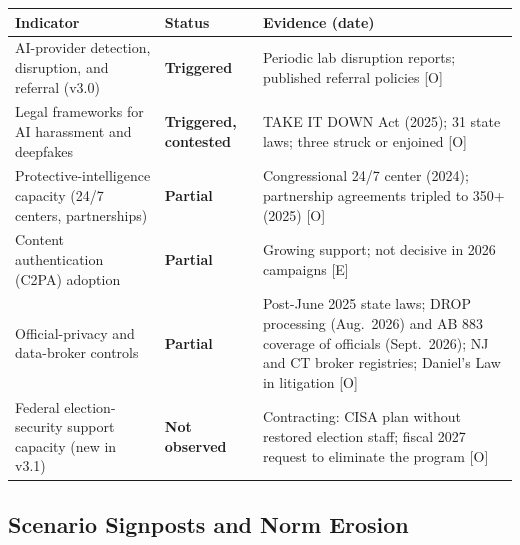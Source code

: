 \documentclass[11pt,letterpaper]{article}
\begin{document}
\begin{center}
\footnotesize
\begin{tabular}{L{4.6cm}L{1.9cm}L{7.6cm}}
\toprule
\textbf{Indicator} & \textbf{Status} & \textbf{Evidence (date)} \\
\midrule
AI-provider detection, disruption, and referral (v3.0) & \textcolor{alertcoral}{\textbf{Triggered}} & Periodic lab disruption reports; published referral policies [O] \\
Legal frameworks for AI harassment and deepfakes & \textcolor{alertcoral}{\textbf{Triggered, contested}} & TAKE IT DOWN Act (2025); 31 state laws; three struck or enjoined [O] \\
Protective-intelligence capacity (24/7 centers, partnerships) & \textcolor{warningamber}{\textbf{Partial}} & Congressional 24/7 center (2024); partnership agreements tripled to 350+ (2025) [O] \\
Content authentication (C2PA) adoption & \textcolor{warningamber}{\textbf{Partial}} & Growing support; not decisive in 2026 campaigns [E] \\
Official-privacy and data-broker controls & \textcolor{warningamber}{\textbf{Partial}} & Post-June 2025 state laws; DROP processing (Aug.\ 2026) and AB 883 coverage of officials (Sept.\ 2026); NJ and CT broker registries; Daniel's Law in litigation [O] \\
Federal election-security support capacity (new in v3.1) & \textcolor{coolgray}{\textbf{Not observed}} & Contracting: CISA plan without restored election staff; fiscal 2027 request to eliminate the program [O] \\
\bottomrule
\end{tabular}
\end{center}

\subsection{Scenario Signposts and Norm Erosion}
\end{document}

